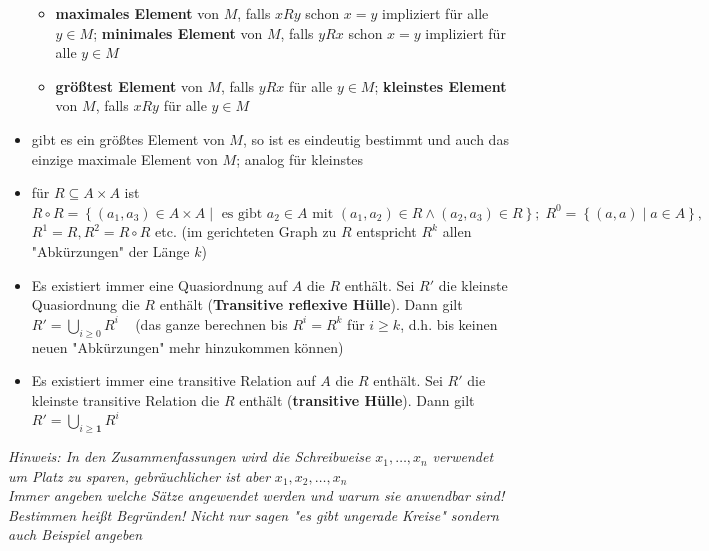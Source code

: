 \documentclass[10pt,a4paper]{article}
\begin{document}
\begin{itemize}
\begin{itemize}
\item \textbf{maximales Element} von $M$, falls $xRy$ schon $x=y$ impliziert für alle $y\in M$; \textbf{minimales Element} von $M$, falls $yRx$ schon $x=y$ impliziert für alle $y\in M$
\item \textbf{größtest Element} von $M$, falls $yRx$ für alle $y\in M$; \textbf{kleinstes Element} von $M$, falls $xRy$ für alle $y\in M$ 
\end{itemize}

\item gibt es ein größtes Element von $M$, so ist es eindeutig bestimmt und auch das einzige maximale Element von $M$; analog für kleinstes 
\item für $R\subseteq A\times A$ ist $R\circ R=\left\lbrace (a_{1},a_{3})\in A\times A\mid \text{ es gibt } a_{2} \in A \text{ mit } (a_{1},a_{2}) \in R\land (a_{2},a_{3})\in R\right\rbrace; \;R^{0}=\left\lbrace (a,a) \mid a\in A\right\rbrace,$\\ $R^{1}=R, R^{2}=R\circ R$ etc. (im gerichteten Graph zu $R$ entspricht $R^{k}$ allen "Abkürzungen" der Länge $k$)
\item Es existiert immer eine Quasiordnung auf $A$ die $R$ enthält. Sei $R'$ die kleinste Quasiordnung die $R$ enthält (\textbf{Transitive reflexive Hülle}). Dann gilt $R'=\bigcup_{i\geq 0} R^{i}\;\;\;$  (das ganze berechnen bis $R^{i}=R^{k}$ für $i\geq k$, d.h. bis keinen neuen "Abkürzungen" mehr hinzukommen können)
\item Es existiert immer eine transitive Relation auf $A$ die $R$ enthält. Sei $R'$ die kleinste transitive Relation die $R$ enthält (\textbf{transitive Hülle}). Dann gilt $R'=\bigcup_{i\geq \boldsymbol{1}} R^{i}$
\end{itemize}
\textit{Hinweis: In den Zusammenfassungen wird die Schreibweise} $x_{1},\dotsc ,x_{n}$ \textit{verwendet um Platz zu sparen,} \textit{gebräuchlicher ist aber} $x_{1},x_{2},\dotsc ,x_{n}$\\
\textit{Immer angeben welche Sätze angewendet werden und warum sie anwendbar sind!}\\
\textit{Bestimmen heißt Begründen! Nicht nur sagen "es gibt ungerade Kreise" sondern auch Beispiel angeben}
\end{document}
